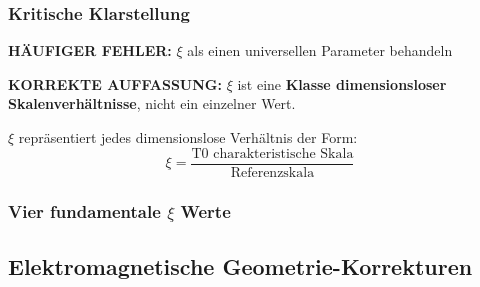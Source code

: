 	\subsubsection{Kritische Klarstellung}
	\label{subsubsec:kritische_klarstellung}
	
	\begin{tcolorbox}[colback=red!10!white,colframe=red!75!black,title=KRITISCHE WARNUNG: $\xi$ Parameter Verwirrung]
		\textbf{HÄUFIGER FEHLER:} $\xi$ als einen universellen Parameter behandeln
		
		\textbf{KORREKTE AUFFASSUNG:} $\xi$ ist eine \textbf{Klasse dimensionsloser Skalenverhältnisse}, nicht ein einzelner Wert.
		
		$\xi$ repräsentiert jedes dimensionslose Verhältnis der Form:
		\begin{equation}
			\xi = \frac{\text{T0 charakteristische Skala}}{\text{Referenzskala}}
		\end{equation}
	\end{tcolorbox}
	
	\subsubsection{Vier fundamentale $\xi$ Werte}
	\label{subsubsec:vier_fundamentale_werte}
	
	\begin{table}[htbp]
		\centering
		\caption{Die vier fundamentalen $\xi$ Parameterwerte}
		\label{tab:vier_xi_werte}
	\end{table}
	
	\subsection{Elektromagnetische Geometrie-Korrekturen}
	\label{subsec:em_korrekturen}
	
